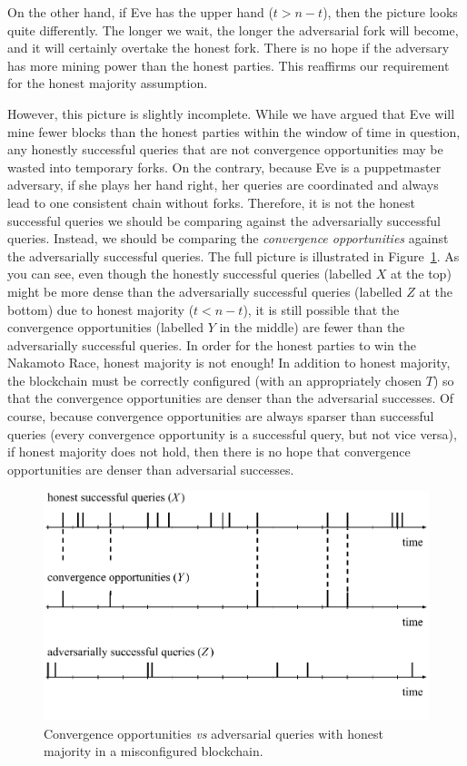 On the other hand, if Eve has the upper hand ($t > n - t$), then the picture looks quite differently.
The longer we wait, the longer the adversarial fork will become, and it will certainly overtake the
honest fork. There is no hope if the adversary has more mining power than the honest parties. This
reaffirms our requirement for the honest majority assumption.

However, this picture is slightly incomplete. While we have argued that Eve will mine fewer blocks
than the honest parties within the window of time in question, any honestly successful queries that are
not convergence opportunities may be wasted into temporary forks. On the contrary, because Eve
is a puppetmaster adversary, if she plays her hand right, her queries are coordinated and always
lead to one consistent chain without forks. Therefore, it is not the honest successful queries
we should be comparing against the adversarially successful queries. Instead, we should be comparing
the \emph{convergence opportunities} against the adversarially successful queries. The full
picture is illustrated in Figure~\ref{fig.x-vs-y-vs-z}. As you can see, even though the honestly
successful queries (labelled $X$ at the top) might be more dense than the adversarially successful queries
(labelled $Z$ at the bottom) due to honest majority ($t < n - t$), it is still possible that
the convergence opportunities (labelled $Y$ in the middle) are fewer than the adversarially successful
queries. In order for the honest parties to win the Nakamoto Race, honest majority is not enough!
In addition to honest majority, the blockchain must be correctly configured (with an appropriately
chosen $T$) so that the convergence opportunities are denser than the adversarial successes.
Of course, because convergence opportunities are always sparser than successful queries
(every convergence opportunity is a successful query, but not vice versa),
if honest majority does not hold, then there is no hope that convergence opportunities are denser
than adversarial successes.

\begin{figure}[h]
    \centering
    \includegraphics[width=0.8 \columnwidth,keepaspectratio]{figures/x-vs-y-vs-z.pdf}
    \caption{Convergence opportunities \emph{vs} adversarial queries with honest majority
             in a misconfigured blockchain.}
    \label{fig.x-vs-y-vs-z}
\end{figure}


